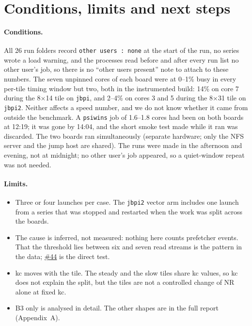 \documentclass[10pt,a4paper]{article}
\newcommand{\iss}[1]{\href{https://github.com/JieGH/RVV_code_gen_via_MLIR_xDSL/issues/#1}{\##1}}
\begin{document}
\section{Conditions, limits and next steps}
\label{sec:nextsteps}
\paragraph{Conditions.} All 26 run folders record \texttt{other users : none} at the start of the run, no series wrote
a load warning, and the processes read before and after every run list no other user's job, so there is no
``other users present'' note to attach to these numbers. The seven unpinned cores of each board were at 0--1\% busy
in every per-tile timing window but two, both in the instrumented build: 14\% on core 7 during the 8$\times$14 tile on
\texttt{jbpi}, and 2--4\% on cores 3 and 5 during the 8$\times$31 tile on \texttt{jbpi2}. Neither affects a speed
number, and we do not know whether it came from outside the benchmark. A \texttt{psiwins} job of 1.6--1.8 cores had been on both
boards at 12:19; it was gone by 14:04, and the short smoke test made while it ran was discarded. The two boards ran
simultaneously (separate hardware; only the NFS server and the jump host are shared). The runs were made in the
afternoon and evening, not at midnight; no other user's job appeared, so a quiet-window repeat was not needed.

\paragraph{Limits.}
\begin{itemize}
  \item Three or four launches per case. The \texttt{jbpi2} vector arm includes one launch from a series that was
  stopped and restarted when the work was split across the boards.
  \item The cause is inferred, not measured: nothing here counts prefetcher events. That the threshold lies between six
  and seven read streams is the pattern in the data; \iss{44} is the direct test.
  \item kc moves with the tile. The steady and the slow tiles share kc values, so kc does not explain the split, but
  the tiles are not a controlled change of NR alone at fixed kc.
  \item B3 only is analysed in detail. The other shapes are in the full report (Appendix~A).
\end{itemize}
\end{document}
